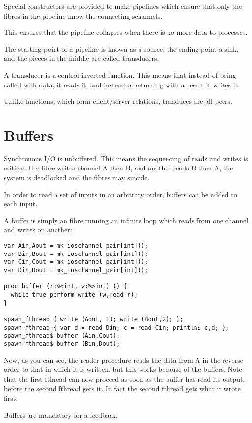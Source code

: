 \documentclass[oneside]{book}
\begin{document}
Special constructors are provided to make pipelines which ensure
that only the fibres in the pipeline know the connecting schannels.

This ensures that the pipeline collapses when there is no more
data to processes.

The starting point of a pipeline is known as a source,
the ending point a sink, and the pieces in the middle
are called transducers.

A transducer is a control inverted function. This means that
instead of being called with data, it reads it, and instead
of returning with a result it writes it.

Unlike functions, which form client/server relations,
tranduces are all peers.

\section{Buffers}
Synchronous I/O is unbuffered. This means the sequencing of reads
and writes is critical. If a fibre writes channel A then B, and another
reads B then A, the system is deadlocked and the fibres may suicide.

In order to read a set of inputs in an arbitrary order, buffers can
be added to each input.

A buffer is simply an fibre running an infinite loop which reads from one
channel and writes on another:

\begin{verbatim}
var Ain,Aout = mk_ioschannel_pair[int]();
var Bin,Bout = mk_ioschannel_pair[int]();
var Cin,Cout = mk_ioschannel_pair[int]();
var Din,Dout = mk_ioschannel_pair[int]();

proc buffer (r:%<int, w:%>int) () { 
  while true perform write (w,read r); 
}

spawn_fthread { write (Aout, 1); write (Bout,2); };
spawn_fthread { var d = read Din; c = read Cin; println$ c,d; };
spawn_fthread$ buffer (Ain,Cout);
spawn_fthread$ buffer (Bin,Dout);
\end{verbatim}

Now, as you can see, the reader procedure reads the data from A
in the reverse order to that in which it is written, but
this works because of the buffers. Note that the first fthread
can now proceed as soon as the buffer has read its output,
before the second fthread gets it. In fact the second fthread
gets what it wrote first.

Buffers are mandatory for a feedback.
\end{document}
